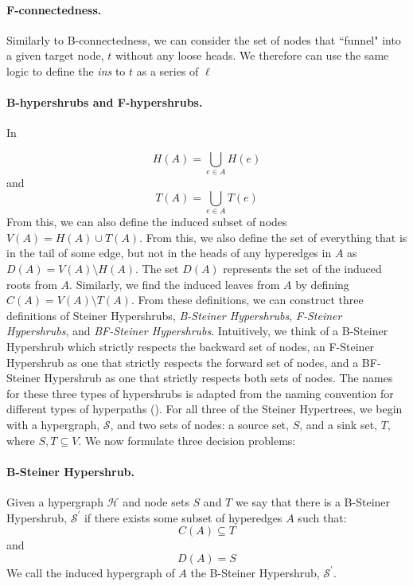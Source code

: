 \documentclass[12pt,twoside]{reedthesis}
\theoremstyle{definition}
\begin{document}
\paragraph{F-connectedness.}Similarly to B-connectedness, we can consider the set of nodes that ``funnel" into a given target node, $t$ without any loose heads. We therefore can use the same logic to define the \textit{ins} to $t$ as a series of $\ell$

\paragraph{B-hypershrubs and F-hypershrubs.}In

\begin{equation}
  H(A) = \bigcup_{e \in A} H(e)
\end{equation}
and
\begin{equation}
  T(A) = \bigcup_{e \in A} T(e)
\end{equation}
From this, we can also define the induced subset of nodes $V(A) = H(A) \cup T(A)$. From this, we also define the set of everything that is in the tail of some edge, but not in the heads of any hyperedges in $A$ as $D(A) = V(A) \setminus H(A)$. The set $D(A)$ represents the set of the induced roots from $A$. Similarly, we find the induced leaves from $A$ by defining $C(A) = V(A) \setminus T(A)$. From these definitions, we can construct three definitions of Steiner Hypershrubs, \textit{B-Steiner Hypershrubs}, \textit{F-Steiner Hypershrubs}, and \textit{BF-Steiner Hypershrubs}. Intuitively, we think of a B-Steiner Hypershrub which strictly respects the backward set of nodes, an F-Steiner Hypershrub as one that strictly respects the forward set of nodes, and a BF-Steiner Hypershrub as one that strictly respects both sets of nodes. The names for these three types of hypershrubs is adapted from the naming convention for different types of hyperpaths (\cite{Gallo1993}). For all three of the Steiner Hypertrees, we begin with a hypergraph, $\mathcal{S}$, and two sets of nodes: a source set, $S$, and a sink set, $T$, where $S,T \subseteq V$. We now formulate three decision problems:\par
\paragraph{B-Steiner Hypershrub.}Given a hypergraph $\mathcal{H}$ and node sets $S$ and $T$ we say that there is a B-Steiner Hypershrub, $\mathcal{S}^{\prime}$ if there exists some subset of hyperedges $A$ such that:
\begin{equation*}
  C(A) \subseteq T
\end{equation*}
and
\begin{equation*}
  D(A) = S
\end{equation*}
We call the induced hypergraph of $A$ the B-Steiner Hypershrub, $\mathcal{S}^{\prime}$.\par
\end{document}
